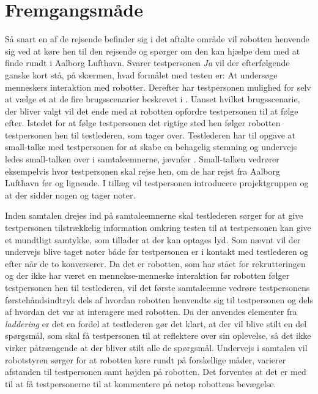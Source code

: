 \section{Fremgangsmåde}
\label{ParametreFremgangsmaade}
%
Så snart en af de rejsende befinder sig i det aftalte område vil robotten henvende sig ved at køre hen til den rejsende og spørger om den kan hjælpe dem med at finde rundt i Aalborg Lufthavn. Svarer testpersonen \textit{Ja} vil der efterfølgende ganske kort stå, på skærmen, hvad formålet med testen er: At undersøge menneskers interaktion med robotter. Derefter har testpersonen mulighed for selv at vælge et at de fire brugsscenarier beskrevet i . Uanset hvilket brugsscenarie, der bliver valgt vil det ende med at robotten opfordre testpersonen til at følge efter. Istedet for at følge testpersonen det rigtige sted hen følger robotten testpersonen hen til testlederen, som tager over. Testlederen har til opgave at small-talke med testpersonen for at skabe en behagelig stemning og undervejs ledes small-talken over i samtaleemnerne, jævnfør . Small-talken vedrører eksempelvis hvor testpersonen skal rejse hen, om de har rejst fra Aalborg Lufthavn før og lignende. I tillæg vil testpersonen introducere projektgruppen og at der sidder nogen og tager noter. 

Inden samtalen drejes ind på samtaleemnerne skal testlederen sørger for at give testpersonen tilstrækkelig information omkring testen til at testpersonen kan give et mundtligt samtykke, som tillader at der kan optages lyd. Som nævnt vil der undervejs blive taget noter både før testpersonen er i kontakt med testlederen og efter når de to konverserer. \blankline
%
Da det er robotten, som har stået for rekrutteringen og der ikke har været en mennekse-menneske interaktion før robotten følger testpersonen hen til testlederen, vil det første samtaleemne vedrøre testpersonens førstehåndsindtryk dels af hvordan robotten henvendte sig til testpersonen og dels af hvordan det var at interagere med robotten. Da der anvendes elementer fra \textit{laddering} er det en fordel at testlederen gør det klart, at der vil blive stilt en del spørgsmål, som skal få testpersonen til at reflektere over sin oplevelse, så det ikke virker påtrængende at der bliver stilt alle de spørgsmål. Undervejs i samtalen vil robotstyren sørger for at robotten køre rundt på forskellige måder, varierer afstanden til testpersonen samt højden på robotten. Det forventes at det er med til at få testpersonerne til at kommentere på netop robottens bevægelse. 

